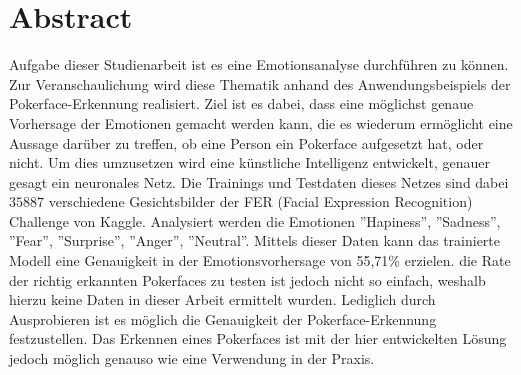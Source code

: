 \documentclass[12pt, a4paper]{report}
\begin{document}
\section*{Abstract}
Aufgabe dieser Studienarbeit ist es eine Emotionsanalyse durchführen zu können. Zur Veranschaulichung wird diese Thematik anhand des Anwendungsbeispiels der Pokerface-Erkennung realisiert.
Ziel ist es dabei, dass eine möglichst genaue Vorhersage der Emotionen gemacht werden kann, die es wiederum ermöglicht eine Aussage darüber zu treffen, ob eine Person ein Pokerface aufgesetzt hat, oder nicht.
Um dies umzusetzen wird eine künstliche Intelligenz entwickelt, genauer gesagt ein neuronales Netz. Die Trainings und Testdaten dieses Netzes sind dabei $35887 $ verschiedene Gesichtsbilder der FER (Facial Expression Recognition) Challenge von Kaggle. Analysiert werden die Emotionen ''Hapiness'', ''Sadness'', ''Fear'', ''Surprise'', ''Anger'', ''Neutral''. Mittels dieser Daten kann das trainierte Modell eine Genauigkeit in der Emotionsvorhersage von 55,71\% erzielen. die Rate der richtig erkannten Pokerfaces zu testen ist jedoch nicht so einfach, weshalb hierzu keine Daten in dieser Arbeit ermittelt wurden. Lediglich durch Ausprobieren ist es möglich die Genauigkeit der Pokerface-Erkennung festzustellen. Das Erkennen eines Pokerfaces ist mit der hier entwickelten Lösung jedoch möglich genauso wie eine Verwendung in der Praxis. 


\newpage
\renewcommand{\thefigure}{\Alph{chapter}.\Alph{figure}}
\renewcommand{\thetable}{\Roman{chapter}.\Roman{table}}

\tableofcontents
\listoffigures
\listoftables
\lstlistoflistings
\newpage
\end{document}
